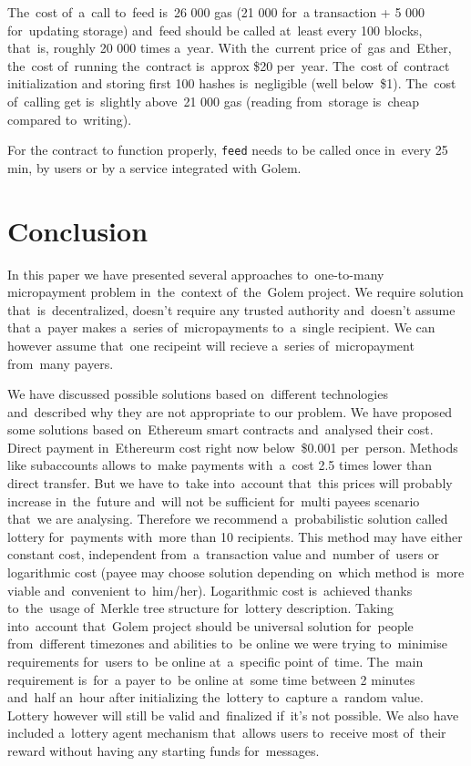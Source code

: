 \documentclass[a4paper]{article}
\begin{document}
    The~cost of~a~call to~feed is~26 000 gas (21 000 for~a transaction + 5 000 for~updating storage) and~feed should
    be called at~least every 100 blocks, that~is, roughly 20 000 times a~year. With the~current price of~gas
    and~Ether, the~cost of~running the~contract is~approx \$20 per~year. The~cost of~contract initialization and
    storing first 100 hashes is~negligible (well below~\$1). The~cost of~calling get is~slightly above~21 000 gas
    (reading from~storage is~cheap compared to~writing).

    For the contract to function properly, \texttt{feed} needs to be called once in~every 25 min, by users or
    by a service integrated with Golem.

\section{Conclusion}
    In this paper we have presented several approaches to~one-to-many micropayment problem in~the~context of~the~Golem
    project. We require solution that~is~decentralized, doesn't require any trusted authority and~doesn't assume that
    a~payer makes a~series of~micropayments to~a~single recipient. We can however assume that~one recipeint will
    recieve a~series of~micropayment  from~many payers.

    We have discussed possible solutions based on~different technologies and~described why they are not appropriate to
    our problem. We have proposed some solutions based on~Ethereum smart contracts and~analysed their cost.
    Direct payment in~Ethereurm cost right now below~\$0.001 per~person. Methods like  subaccounts allows to~make
    payments with~a~cost 2.5 times lower than direct transfer. But we have to~take into~account that~this prices will
    probably increase in~the~future and~will not be sufficient for~multi payees scenario that~we are analysing.
    Therefore we recommend a~probabilistic solution called lottery for~payments with~more than 10 recipients.
    This method may have either constant cost, independent from~a~transaction value and~number of~users or logarithmic
    cost (payee may choose solution depending on~which method is~more viable and~convenient to~him/her). Logarithmic
    cost is~achieved thanks to~the~usage of~Merkle tree structure for~lottery description.
    Taking into~account that~Golem project should be universal solution for~people from~different timezones and
    abilities to~be online we were trying to~minimise requirements for~users to~be online at~a~specific point of~time.
    The~main requirement is~for~a payer to~be online at~some time between 2 minutes and~half an~hour after initializing
    the~lottery to~capture a~random value. Lottery however will still be valid and~finalized if~it's not possible.
    We also have included a~lottery agent mechanism that~allows users to~receive most of~their reward without having
    any starting funds for~messages.
\end{document}
